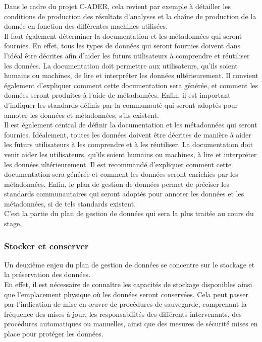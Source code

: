 Dans le cadre du projet C-ADER, cela revient par exemple à détailler les conditions de production des résultats d’analyses et la chaîne de production de la donnée en fonction des différentes machines utilisées.\\

Il faut également déterminer la documentation et les métadonnées qui seront fournies. En effet, tous les types de données qui seront fournies doivent dans l’idéal être décrites afin d’aider les futurs utilisateurs à comprendre et réutiliser les données. La documentation doit permettre aux utilisateurs, qu'ils soient humains ou machines, de lire et interpréter les données ultérieurement. Il convient également d'expliquer comment cette documentation sera générée, et comment les données seront produites à l’aide de métadonnées. Enfin, il est important d'indiquer les standards définis par la communauté qui seront adoptés pour annoter les données et métadonnées, s'ils existent.\\

Il est également central de définir la documentation et les métadonnées qui seront fournies. Idéalement, toutes les données doivent être décrites de manière à aider les futurs utilisateurs à les comprendre et à les réutiliser. La documentation doit venir aider les utilisateurs, qu'ils soient humains ou machines, à lire et interpréter les données ultérieurement. Il est recommandé d’expliquer comment cette documentation sera générée et comment les données seront enrichies par les métadonnées. Enfin, le plan de gestion de données permet de préciser les standards communautaires qui seront adoptés pour annoter les données et les métadonnées, si de tels standards existent.\\

C’est la partie du plan de gestion de données qui sera la plus traitée au cours du stage.

            \subsubsection{Stocker et conserver}

Un deuxième enjeu du plan de gestion de données se concentre sur le stockage et la préservation des données.\\

En effet, il est nécessaire de connaître les capacités de stockage disponibles ainsi que l'emplacement physique où les données seront conservées. Cela peut passer par l’indication de mise en œuvre de procédures de sauvegarde, comprenant la fréquence des mises à jour, les responsabilités des différents intervenants, des procédures automatiques ou manuelles, ainsi que des mesures de sécurité mises en place pour protéger les données.\\

